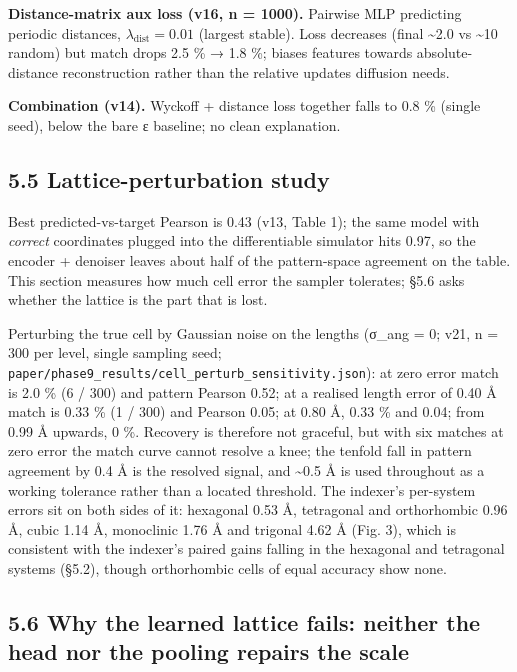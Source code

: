 \documentclass[
  11pt,
]{article}
\newcounter{none} %
\begin{document}
\textbf{Distance-matrix aux loss (v16, n = 1000).} Pairwise MLP
predicting periodic distances, \(\lambda_\text{dist} = 0.01\) (largest
stable). Loss decreases (final \textasciitilde2.0 vs \textasciitilde10
random) but match drops 2.5 \% → 1.8 \%; biases features towards
absolute-distance reconstruction rather than the relative updates
diffusion needs.

\textbf{Combination (v14).} Wyckoff + distance loss together falls to
0.8 \% (single seed), below the bare ε baseline; no clean explanation.

\subsection{5.5 Lattice-perturbation
study}\label{lattice-perturbation-study}

Best predicted-vs-target Pearson is 0.43 (v13, Table 1); the same model
with \emph{correct} coordinates plugged into the differentiable
simulator hits 0.97, so the encoder + denoiser leaves about half of the
pattern-space agreement on the table. This section measures how much
cell error the sampler tolerates; §5.6 asks whether the lattice is the
part that is lost.

Perturbing the true cell by Gaussian noise on the lengths (σ\_ang = 0;
v21, n = 300 per level, single sampling seed;
\texttt{paper/phase9\_results/cell\_perturb\_sensitivity.json}): at zero
error match is 2.0 \% (6 / 300) and pattern Pearson 0.52; at a realised
length error of 0.40 Å match is 0.33 \% (1 / 300) and Pearson 0.05; at
0.80 Å, 0.33 \% and 0.04; from 0.99 Å upwards, 0 \%. Recovery is
therefore not graceful, but with six matches at zero error the match
curve cannot resolve a knee; the tenfold fall in pattern agreement by
0.4 Å is the resolved signal, and \textasciitilde0.5 Å is used
throughout as a working tolerance rather than a located threshold. The
indexer's per-system errors sit on both sides of it: hexagonal 0.53 Å,
tetragonal and orthorhombic 0.96 Å, cubic 1.14 Å, monoclinic 1.76 Å and
trigonal 4.62 Å (Fig. 3), which is consistent with the indexer's paired
gains falling in the hexagonal and tetragonal systems (§5.2), though
orthorhombic cells of equal accuracy show none.

\subsection{5.6 Why the learned lattice fails: neither the head nor the
pooling repairs the
scale}\label{why-the-learned-lattice-fails-neither-the-head-nor-the-pooling-repairs-the-scale}
\end{document}
